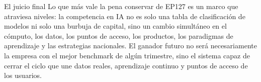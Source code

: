 \documentclass[a4paper]{article}
\begin{document}
\begin{importantbox}{El juicio final}
Lo que más vale la pena conservar de EP127 es un marco que atraviesa niveles: la competencia en IA no es solo una tabla de clasificación de modelos ni solo una burbuja de capital, sino un cambio simultáneo en el cómputo, los datos, los puntos de acceso, los productos, los paradigmas de aprendizaje y las estrategias nacionales. El ganador futuro no será necesariamente la empresa con el mejor benchmark de algún trimestre, sino el sistema capaz de cerrar el ciclo que une datos reales, aprendizaje continuo y puntos de acceso de los usuarios.
\end{importantbox}
\end{document}
